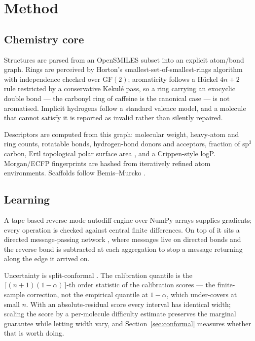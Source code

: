 \section{Method}

\subsection{Chemistry core}

Structures are parsed from an OpenSMILES subset into an explicit atom/bond graph.
Rings are perceived by Horton's smallest-set-of-smallest-rings algorithm with
independence checked over $\mathrm{GF}(2)$; aromaticity follows a Hückel $4n+2$ rule
restricted by a conservative Kekulé pass, so a ring carrying an exocyclic double bond
--- the carbonyl ring of caffeine is the canonical case --- is not aromatised.
Implicit hydrogens follow a standard valence model, and a molecule that cannot
satisfy it is reported as invalid rather than silently repaired.

Descriptors are computed from this graph: molecular weight, heavy-atom and ring
counts, rotatable bonds, hydrogen-bond donors and acceptors, fraction of sp$^3$
carbon, Ertl topological polar surface area \cite{ertl2000fast}, and a Crippen-style
logP. Morgan/ECFP fingerprints \cite{rogers2010extended} are hashed from iteratively
refined atom environments. Scaffolds follow Bemis--Murcko \cite{bemis1996properties}.

\subsection{Learning}

A tape-based reverse-mode autodiff engine over NumPy arrays supplies gradients; every
operation is checked against central finite differences. On top of it sits a directed
message-passing network \cite{yang2019analyzing}, where messages live on directed
bonds and the reverse bond is subtracted at each aggregation to stop a message
returning along the edge it arrived on.

Uncertainty is split-conformal \cite{vovk2005algorithmic,lei2018distribution}. The
calibration quantile is the $\lceil (n+1)(1-\alpha) \rceil$-th order statistic of the
calibration scores --- the finite-sample correction, not the empirical quantile at
$1-\alpha$, which under-covers at small $n$. With an absolute-residual score every
interval has identical width; scaling the score by a per-molecule difficulty estimate
preserves the marginal guarantee while letting width vary, and
Section~\ref{sec:conformal} measures whether that is worth doing.

